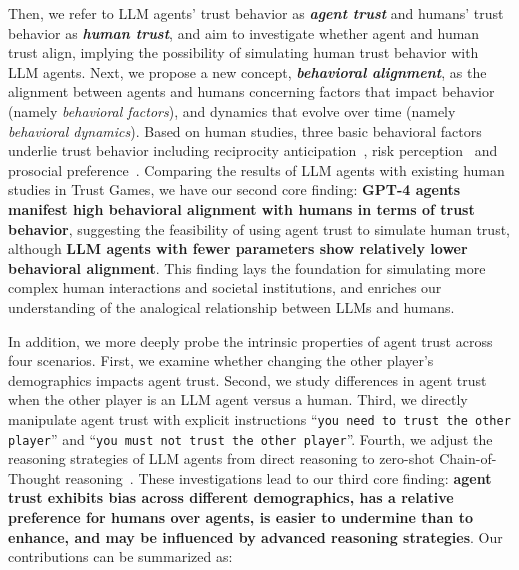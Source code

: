 Then, we refer to LLM agents' trust behavior as \textbf{\textit{agent trust}} and humans' trust behavior as \textbf{\textit{human trust}}, and aim to investigate whether agent and human trust align, implying the possibility of simulating human trust behavior with LLM agents. Next, we propose a new concept, \textbf{\textit{behavioral alignment}}, as the alignment between agents and humans concerning factors that impact behavior (namely \textit{behavioral factors}), and  dynamics that evolve over time (namely \textit{behavioral dynamics}). 
Based on human studies, three basic behavioral factors underlie trust behavior including reciprocity anticipation~\citep{berg1995trust}, risk perception~\citep{BOHNET2004467} and prosocial preference~\citep{ferrerTrustGames2019a}. 
Comparing the results of LLM agents with existing human studies in Trust Games,
we have our second core finding: \textbf{GPT-4 agents manifest high behavioral alignment with humans in terms of  trust behavior}, suggesting the feasibility of using agent trust to simulate human trust, although \textbf{LLM agents with fewer parameters show relatively lower behavioral alignment}. This finding lays the foundation for simulating more complex human interactions and societal institutions, and enriches our understanding of the 
 analogical relationship between LLMs and humans.


\vspace{-0.05cm}
In addition, we more deeply probe the intrinsic properties of agent trust across four scenarios. First, we examine whether changing the other player's demographics impacts agent trust. Second, we study differences in agent trust when the other player is an LLM agent versus a human. Third, we directly manipulate agent trust with  explicit instructions
``\texttt{you need to trust the other player}'' and ``\texttt{you must not trust the other player}''. Fourth, we adjust the reasoning strategies of LLM agents from direct reasoning to zero-shot Chain-of-Thought reasoning~\citep{cot}. These investigations lead to our third core finding: 
\textbf{agent trust exhibits bias across different demographics, has a relative preference for humans over agents, is easier to undermine than to enhance, and may be influenced by advanced reasoning strategies}.
Our contributions can be summarized as:

